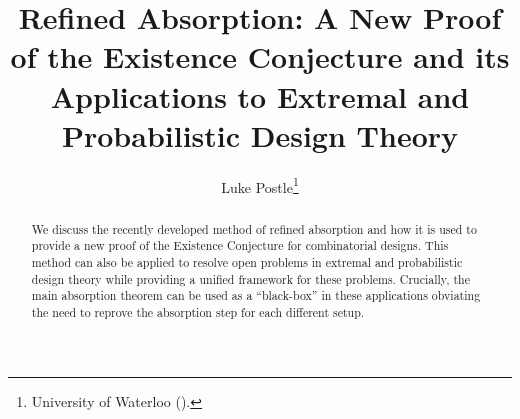 \documentclass[twoside,leqno]{article}
\begin{document}
%
\newcommand\relatedversion{}

\title{\Large Refined Absorption: A New Proof of the Existence Conjecture and its Applications to Extremal and Probabilistic Design Theory\relatedversion}
    \author{Luke Postle\thanks{University of Waterloo ().}
}

\date{}

\maketitle







\begin{abstract} 
We discuss the recently developed method of refined absorption and how it is used to provide a new proof of the Existence Conjecture for combinatorial designs. This method can also be applied to resolve open problems in extremal and probabilistic design theory while providing a unified framework for these problems. Crucially, the main absorption theorem can be used as a ``black-box'' in these applications obviating the need to reprove the absorption step for each different setup.
\end{abstract}
\end{document}
